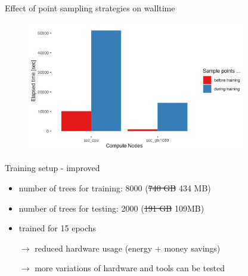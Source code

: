 \documentclass[compress,aspectratio=169]{beamer}
\begin{document}
\begin{frame}{Effect of point sampling strategies on walltime}
    \vspace{-1em}
    \begin{center}
    \begin{figure}
        \includegraphics[width=0.85\textwidth]{../../data/sacct_barplot_by_nodes_sample-points-effect}
    \end{figure}
    \end{center}
\end{frame}

\begin{frame}{Training setup - improved}
\begin{itemize}
    \item number of trees for training: 8000 (\sout{740 GB} 434 MB)
    \vspace{1em}
    \item number of trees for testing: 2000 (\sout{191 GB} 109MB)
    \vspace{1em}
    \item trained for 15 epochs
    \vspace{2em}
    \hline
    \vspace{2em}
    \item[$\rightarrow$] reduced hardware usage (energy + money savings)
    \item[$\rightarrow$] more variations of hardware and tools can be tested
\end{itemize}
\end{frame}
\end{document}
